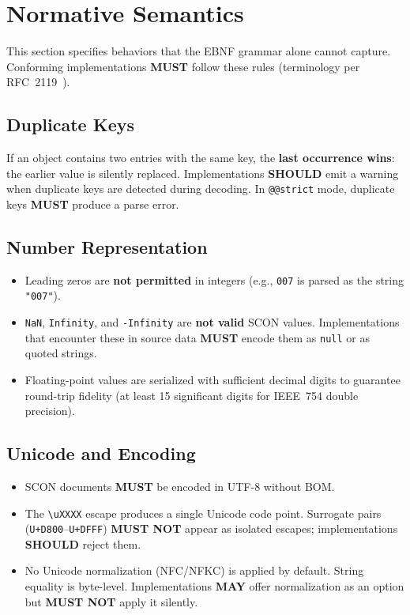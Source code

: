 \documentclass[11pt, a4paper]{article}
\begin{document}
\section{Normative Semantics}
\label{sec:normative}

This section specifies behaviors that the EBNF grammar alone cannot
capture. Conforming implementations \textbf{MUST} follow these rules
(terminology per RFC~2119~\cite{rfc2119}).

\subsection{Duplicate Keys}

If an object contains two entries with the same key, the
\textbf{last occurrence wins}: the earlier value is silently replaced.
Implementations \textbf{SHOULD} emit a warning when duplicate keys
are detected during decoding. In \texttt{@@strict} mode, duplicate
keys \textbf{MUST} produce a parse error.

\subsection{Number Representation}

\begin{itemize}
\item Leading zeros are \textbf{not permitted} in integers
      (e.g., \texttt{007} is parsed as the string \texttt{"007"}).
\item \texttt{NaN}, \texttt{Infinity}, and \texttt{-Infinity} are
      \textbf{not valid} SCON values. Implementations that encounter
      these in source data \textbf{MUST} encode them as \texttt{null}
      or as quoted strings.
\item Floating-point values are serialized with sufficient decimal
      digits to guarantee round-trip fidelity (at least 15 significant
      digits for IEEE~754 double precision).
\end{itemize}

\subsection{Unicode and Encoding}

\begin{itemize}
\item SCON documents \textbf{MUST} be encoded in UTF-8 without BOM.
\item The \texttt{\textbackslash uXXXX} escape produces a single
      Unicode code point. Surrogate pairs (\texttt{U+D800}--\texttt{U+DFFF})
      \textbf{MUST NOT} appear as isolated escapes; implementations
      \textbf{SHOULD} reject them.
\item No Unicode normalization (NFC/NFKC) is applied by default.
      String equality is byte-level. Implementations \textbf{MAY}
      offer normalization as an option but \textbf{MUST NOT} apply
      it silently.
\end{itemize}
\end{document}
